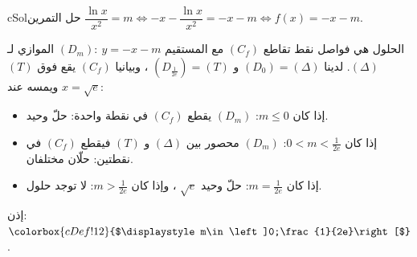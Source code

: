 \documentclass[12pt,a4paper]{article}
\newcounter{exo}
\newenvironment{hal}{\Needspace{12\baselineskip}\begin{otherlanguage}{english}\begin{arbox}[breakable]{cSol}{حل التمرين \theexo}}{\end{arbox}\end{otherlanguage}}
\newcommand{\bx}[1]{\ensuremath{\colorbox{cDef!12}{$\displaystyle #1$}}}
\begin{document}
\begin{hal}
\pb $\dfrac{\ln x}{x^2}=m\iff-x-\dfrac{\ln x}{x^2}=-x-m\iff f(x)=-x-m$.

الحلول هي فواصل نقط تقاطع $(C_f)$ مع المستقيم $(D_m):\ y=-x-m$ الموازي لـ $(\Delta)$. لدينا $(D_0)=(\Delta)$ و $(D_{\frac{1}{2e}})=(T)$ ، وبيانيا $(C_f)$ يقع فوق $(T)$ ويمسه عند $x=\sqrt e$:
\begin{itemize}
\item إذا كان $m\leqslant0$: $(D_m)$ يقطع $(C_f)$ في نقطة واحدة: حلّ وحيد.
\item إذا كان $0<m<\frac{1}{2e}$: $(D_m)$ محصور بين $(\Delta)$ و $(T)$ فيقطع $(C_f)$ في نقطتين: حلّان مختلفان.
\item إذا كان $m=\frac{1}{2e}$: حلّ وحيد $\sqrt e$ ، وإذا كان $m>\frac1{2e}$: لا توجد حلول.
\end{itemize}
إذن: \bx{m\in\left]0;\frac{1}{2e}\right[}.
\end{hal}
\end{document}
